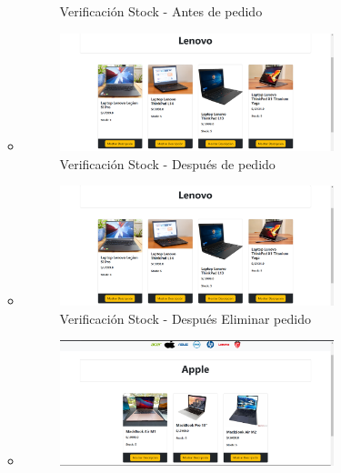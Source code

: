 \documentclass{article}
\begin{document}
\begin{itemize}
\begin{itemize}
\begin{figure}[H]
		      \caption{Verificación Stock - Antes de pedido}
	   \end{figure}
    \item   \begin{figure}[H]
		      \centering
                \includegraphics[width=0.8\textwidth,keepaspectratio]{img/lap4.png}
		      \caption{Verificación Stock - Después de pedido}
	   \end{figure}
    \item   \begin{figure}[H]
		      \centering
                \includegraphics[width=0.8\textwidth,keepaspectratio]{img/lap3.png}
		      \caption{Verificación Stock - Después Eliminar pedido}
	   \end{figure}
    \item   \begin{figure}[H]
		      \centering
                \includegraphics[width=0.8\textwidth,keepaspectratio]{img/apple.png}

\end{figure}
\end{itemize}
\end{itemize}
\end{document}
